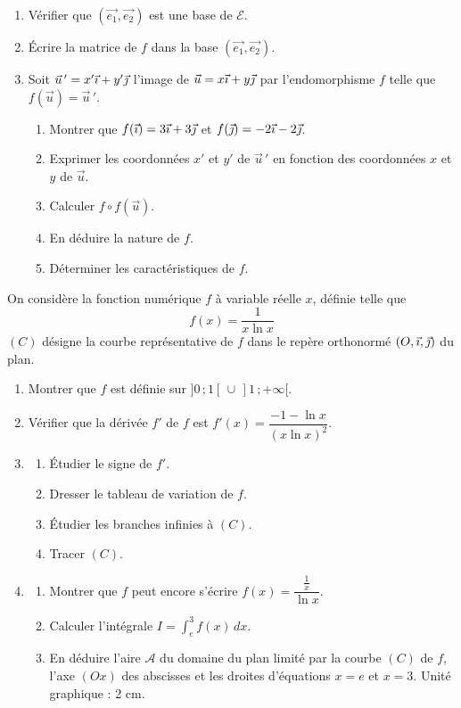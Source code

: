\documentclass[11pt]{article}
\begin{document}
\begin{enumerate}
  \item Vérifier que $(\vec{e_1},\vec{e_2})$ est une base de $\mathcal{E}$.
  \item Écrire la matrice de $f$ dans la base $(\vec{e_1},\vec{e_2})$.
  \item Soit $\vec{u}\,' = x'\vec{\imath} + y'\vec{\jmath}$ l'image de $\vec{u} = x\vec{\imath} + y\vec{\jmath}$ par l'endomorphisme $f$ telle que $f(\vec{u}) = \vec{u}\,'$.
  \begin{enumerate}[label=\alph*.]
    \item Montrer que $f(\vec{\imath}) = 3\vec{\imath} + 3\vec{\jmath}$ et $f(\vec{\jmath}) = -2\vec{\imath} - 2\vec{\jmath}$.
    \item Exprimer les coordonnées $x'$ et $y'$ de $\vec{u}\,'$ en fonction des coordonnées $x$ et $y$ de $\vec{u}$.
    \item Calculer $f \circ f(\vec{u})$.
    \item En déduire la nature de $f$.
    \item Déterminer les caractéristiques de $f$.
  \end{enumerate}
\end{enumerate}


On considère la fonction numérique $f$ à variable réelle $x$, définie telle que
\[ f(x) = \frac{1}{x\ln x} \]
$(C)$ désigne la courbe représentative de $f$ dans le repère orthonormé $(O,\vec{\imath},\vec{\jmath})$ du plan.

\begin{enumerate}
  \item Montrer que $f$ est définie sur $]0\,;1[\,\cup\,]1\,;+\infty[$.
  \item Vérifier que la dérivée $f'$ de $f$ est $f'(x) = \dfrac{-1 - \ln x}{(x\ln x)^2}$.
  \item \begin{enumerate}[label=\alph*.]
    \item Étudier le signe de $f'$.
    \item Dresser le tableau de variation de $f$.
    \item Étudier les branches infinies à $(C)$.
    \item Tracer $(C)$.
  \end{enumerate}
  \item \begin{enumerate}[label=\alph*.]
    \item Montrer que $f$ peut encore s'écrire $f(x) = \dfrac{\frac{1}{x}}{\ln x}$.
    \item Calculer l'intégrale $I = \displaystyle\int_e^3 f(x)\,dx$.
    \item En déduire l'aire $\mathcal{A}$ du domaine du plan limité par la courbe $(C)$ de $f$, l'axe $(Ox)$ des abscisses et les droites d'équations $x = e$ et $x = 3$. Unité graphique : 2 cm.
  \end{enumerate}
\end{enumerate}
\end{document}
